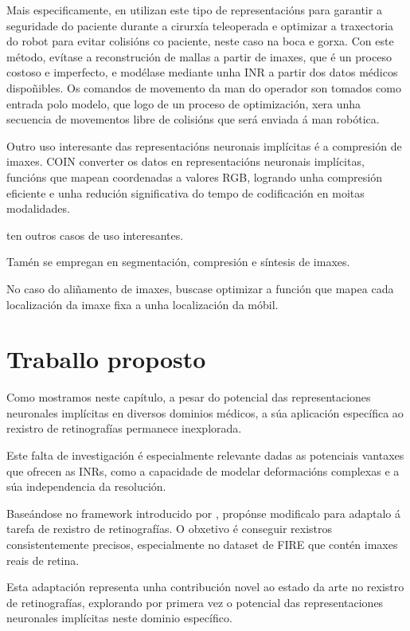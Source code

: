 Mais especificamente, en \cite{teleoperatdrob} utilizan este tipo de representacións para garantir a seguridade do paciente durante a cirurxía teleoperada e optimizar a traxectoria do robot para evitar colisións co paciente, neste caso na boca e gorxa.
Con este método, evítase a reconstrución de mallas a partir de imaxes, que é un proceso costoso e imperfecto, e modélase mediante unha INR a partir dos datos médicos dispoñibles.
Os comandos de movemento da man do operador son tomados como entrada polo modelo, que logo de un proceso de optimización, xera unha secuencia de movementos libre de colisións que será enviada á man robótica.

Outro uso interesante das representacións neuronais implícitas é a compresión de imaxes. COIN \cite{coin} converter os datos en representacións neuronais implícitas, funcións que mapean coordenadas a valores RGB, logrando unha compresión eficiente e unha redución significativa do tempo de codificación en moitas modalidades.

\cite{velikova2024implicitneuralrepresentationsbreathingcompensated} ten outros casos de uso interesantes.

Tamén se empregan en segmentación, compresión e síntesis de imaxes.

No caso do aliñamento de imaxes, buscase optimizar a función que mapea cada localización da imaxe fixa a unha localización da móbil.

\section{Traballo proposto}
\label{sec:Traballo proposto}

Como mostramos neste capítulo, a pesar do potencial das representaciones neuronales implícitas en diversos dominios médicos, a súa aplicación específica ao rexistro de retinografías permanece inexplorada.

Este falta de investigación é especialmente relevante dadas as potenciais vantaxes que ofrecen as INRs, como a capacidade de modelar deformacións complexas e a súa independencia da resolución.

Baseándose no framework introducido por \cite{wolterink2021implicit}, propónse modificalo para adaptalo á tarefa de rexistro de retinografías. O obxetivo é conseguir rexistros consistentemente precisos, especialmente no dataset de FIRE que contén imaxes reais de retina.

Esta adaptación representa unha contribución novel ao estado da arte no rexistro de retinografías, explorando por primera vez o potencial das representaciones neuronales implícitas neste dominio específico.
